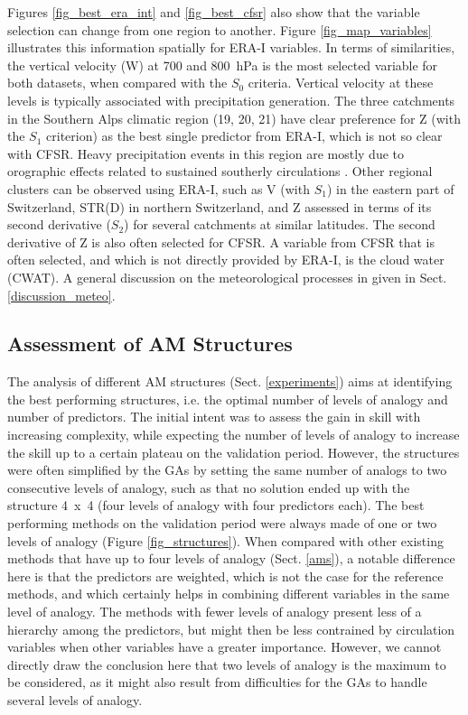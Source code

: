 \documentclass[draft]{agujournal2019}
\begin{document}
Figures \ref{fig_best_era_int} and \ref{fig_best_cfsr} also show that the variable selection can change from one region to another. Figure \ref{fig_map_variables} illustrates this information spatially for ERA-I variables. In terms of similarities, the vertical velocity (W) at 700 and 800~hPa is the most selected variable for both datasets, when compared with the $S_{0}$ criteria. Vertical velocity at these levels is typically associated with precipitation generation. The three catchments in the Southern Alps climatic region (19, 20, 21) have clear preference for Z (with the $S_{1}$ criterion) as the best single predictor from ERA-I, which is not so clear with CFSR. Heavy precipitation events in this region are mostly due to orographic effects related to sustained southerly circulations \cite{Massacand1998}. Other regional clusters can be observed using ERA-I, such as V (with $S_{1}$) in the eastern part of Switzerland, STR(D) in northern Switzerland, and Z assessed in terms of its second derivative ($S_{2}$) for several catchments at similar latitudes. The second derivative of Z is also often selected for CFSR. A variable from CFSR that is often selected, and which is not directly provided by ERA-I, is the cloud water (CWAT). A general discussion on the meteorological processes in given in Sect. \ref{discussion_meteo}.


\subsection{Assessment of AM Structures}
\label{structures}

The analysis of different AM structures (Sect. \ref{experiments}) aims at identifying the best performing structures, i.e. the optimal number of levels of analogy and number of predictors. The initial intent was to assess the gain in skill with increasing complexity, while expecting the number of levels of analogy to increase the skill up to a certain plateau on the validation period. However, the structures were often simplified by the GAs by setting the same number of analogs to two consecutive levels of analogy, such as that no solution ended up with the structure 4~x~4 (four levels of analogy with four predictors each). The best performing methods on the validation period were always made of one or two levels of analogy (Figure \ref{fig_structures}). When compared with other existing methods that have up to four levels of analogy (Sect. \ref{ams}), a notable difference here is that the predictors are weighted, which is not the case for the reference methods, and which certainly helps in combining different variables in the same level of analogy. The methods with fewer levels of analogy present less of a hierarchy among the predictors, but might then be less contrained by circulation variables when other variables have a greater importance. However, we cannot directly draw the conclusion here that two levels of analogy is the maximum to be considered, as it might also result from difficulties for the GAs to handle several levels of analogy.
\end{document}
